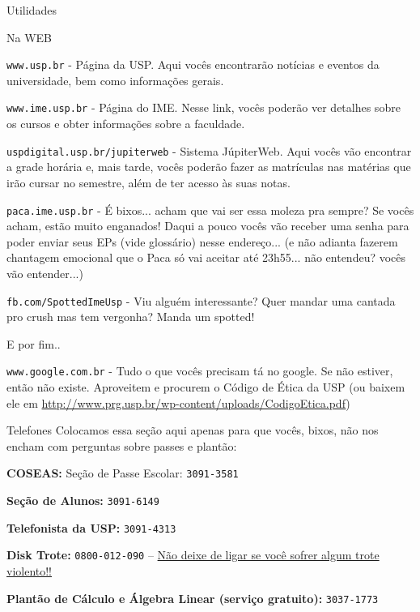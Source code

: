 \begin{secao}{Utilidades}

\begin{subsecao}{Na WEB}

{\tt www.usp.br} - Página da USP. Aqui vocês encontrarão notícias e eventos da
universidade, bem como informações gerais.

{\tt www.ime.usp.br} - Página do IME.
Nesse link, vocês poderão ver detalhes sobre os cursos e obter informações sobre
a faculdade.

{\tt uspdigital.usp.br/jupiterweb} - Sistema JúpiterWeb. Aqui vocês vão
encontrar a grade horária e, mais tarde, vocês poderão fazer as matrículas nas
matérias que irão cursar no semestre, além de ter acesso às suas notas.

{\tt paca.ime.usp.br} - É bixos... acham que vai ser essa moleza pra sempre? Se
vocês acham, estão muito enganados! Daqui a pouco vocês vão receber uma senha para
poder enviar seus EPs (vide glossário) nesse endereço... (e não adianta fazerem
chantagem emocional que o Paca só vai aceitar até 23h55... não entendeu? vocês
vão entender...)

{\tt fb.com/SpottedImeUsp} - Viu alguém interessante? Quer mandar uma cantada 
pro crush mas tem vergonha? Manda um spotted!


E por fim..

{\tt www.google.com.br} - Tudo o que vocês precisam tá no google. Se não estiver,
então não existe. Aproveitem e procurem o Código de Ética da USP (ou baixem ele em
\url{http://www.prg.usp.br/wp-content/uploads/CodigoEtica.pdf})

\end{subsecao}

\begin{subsecao}{Telefones}
Colocamos essa seção aqui apenas para que vocês, bixos, não nos encham com perguntas
sobre passes e plantão:

{\bf COSEAS:} Seção de Passe Escolar: {\tt 3091-3581}

{\bf Seção de Alunos:} {\tt 3091-6149}

{\bf Telefonista da USP:} {\tt 3091-4313}

{\bf Disk Trote:} {\tt 0800-012-090} -- \underline{Não deixe de ligar se você sofrer algum trote violento!!}

{\bf Plantão de Cálculo e Álgebra Linear (serviço gratuito):} {\tt 3037-1773}

\end{subsecao}
\end{secao}
